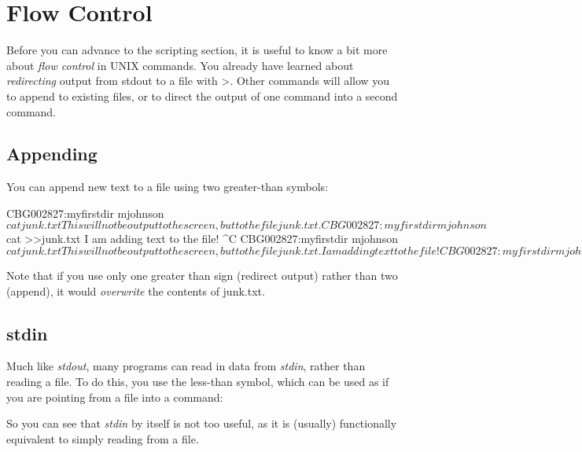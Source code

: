 \documentclass[11pt, oneside]{article}   	%
\begin{document}
\section{Flow Control}
Before you can advance to the scripting section, it is useful to know a bit more about \emph{flow control} in UNIX commands.
You already have learned about \emph{redirecting} output from stdout to a file with \textgreater.
Other commands will allow you to append to existing files, or to direct the output of one command into a second command.

\subsection{Appending}
You can append new text to a file using two greater-than symbols:

\begin{Terminal}[caption=Appending text,label=append]
CBG002827:myfirstdir mjohnson$ cat junk.txt
This will not be output to the screen, but to the file junk.txt.
CBG002827:myfirstdir mjohnson$ cat >>junk.txt
I am adding text to the file!
^C
CBG002827:myfirstdir mjohnson$ cat junk.txt
This will not be output to the screen, but to the file junk.txt.
I am adding text to the file!
CBG002827:myfirstdir mjohnson$ 
\end{Terminal}

Note that if you use only one greater than sign (redirect output) rather than two (append), it would \emph{overwrite} the contents of junk.txt.

\subsection{stdin}
Much like \emph{stdout}, many programs can read in data from \emph{stdin}, rather than reading a file.
To do this, you use the less-than symbol, which can be used as if you are pointing from a file into a command:


So you can see that \emph{stdin} by itself is not too useful, as it is (usually) functionally equivalent to simply reading from a file.
\end{document}
